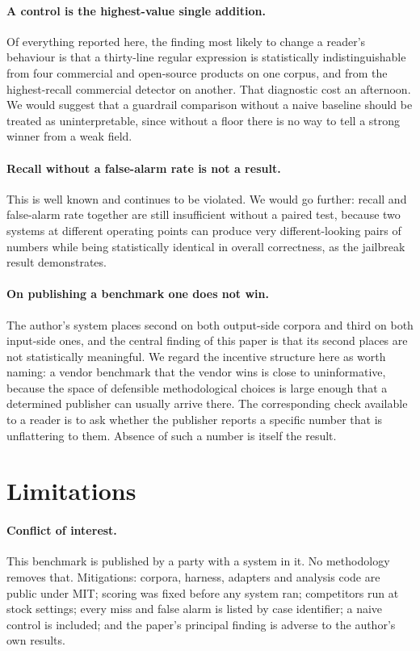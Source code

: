 \documentclass[11pt]{article}
\begin{document}
\paragraph{A control is the highest-value single addition.}
Of everything reported here, the finding most likely to change a reader's
behaviour is that a thirty-line regular expression is statistically
indistinguishable from four commercial and open-source products on one corpus,
and from the highest-recall commercial detector on another. That diagnostic cost
an afternoon. We would suggest that a guardrail comparison without a naive
baseline should be treated as uninterpretable, since without a floor there is no
way to tell a strong winner from a weak field.

\paragraph{Recall without a false-alarm rate is not a result.}
This is well known and continues to be violated. We would go further: recall and
false-alarm rate together are still insufficient without a paired test, because
two systems at different operating points can produce very different-looking
pairs of numbers while being statistically identical in overall correctness, as
the jailbreak result demonstrates.

\paragraph{On publishing a benchmark one does not win.}
The author's system places second on both output-side corpora and third on both
input-side ones, and the central finding of this paper is that its second places
are not statistically meaningful. We regard the incentive structure here as worth
naming: a vendor benchmark that the vendor wins is close to uninformative,
because the space of defensible methodological choices is large enough that a
determined publisher can usually arrive there. The corresponding check available
to a reader is to ask whether the publisher reports a specific number that is
unflattering to them. Absence of such a number is itself the result.

\section{Limitations}

\paragraph{Conflict of interest.} This benchmark is published by a party with a
system in it. No methodology removes that. Mitigations: corpora, harness,
adapters and analysis code are public under MIT; scoring was fixed before any
system ran; competitors run at stock settings; every miss and false alarm is
listed by case identifier; a naive control is included; and the paper's principal
finding is adverse to the author's own results.
\end{document}
